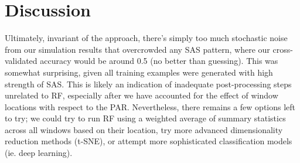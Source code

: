\documentclass[10pt]{article}
\begin{document}
\section{Discussion}

Ultimately, invariant of the approach, there's simply too much stochastic noise from our simulation results that overcrowded any SAS pattern, where our cross-validated accuracy would be around 0.5 (no better than guessing). This was somewhat surprising, given all training examples were generated with high strength of SAS. This is likely an indication of inadequate post-processing steps unrelated to RF, especially after we have accounted for the effect of window locations with respect to the PAR. Nevertheless, there remains a few options left to try; we could try to run RF using a weighted average of summary statistics across all windows based on their location, try more advanced dimensionality reduction methods (t-SNE), or attempt more sophisticated classification models (ie. deep learning). 
\end{document}
